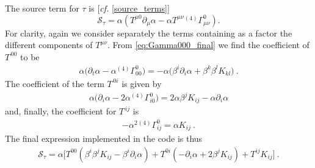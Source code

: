 \documentclass{article}
\begin{document}
The source term for $\tau$ is [{\it cf.} \eqref{source_terms}]
%
\begin{equation}
  \label{eq:SourceT1}
  {\mathcal S}_{\tau} = \alpha \left( T^{\mu 0} \partial_{\mu}
  \alpha - \alpha T^{\mu\nu} {}^{(4)}\Gamma^0_{\mu\nu}\right).
\end{equation}
%
For clarity, again we consider separately the terms containing as a
factor the different components of $T^{\mu\nu}$. From
\eqref{eq:Gamma000_final} we find the coefficient of $T^{\,00}$ to be
%
\begin{eqnarray}
  \label{eq:SourceT3a}
\alpha\big(\partial_t \alpha -\alpha {}^{(4)}\Gamma^0_{00}\big) =
-\alpha\big( \beta^i \partial_i \alpha + \beta^k \beta^l K_{kl}\big)\ .
\end{eqnarray}
%
The coefficient of the term $T^{\,0i}$ is given by
%
\begin{eqnarray}
  \label{eq:SourceT4a}
  \alpha\big(\partial_i \alpha - 2 \alpha {}^{(4)}\Gamma^0_{i0}\big) =
  2 \alpha\beta^j K_{ij} - \alpha\partial_i \alpha
\end{eqnarray}
%
and, finally, the coefficient for $T^{\,ij}$ is
%
\begin{eqnarray}
  \label{eq:SourceT5a}
  -\alpha^2 {}^{(4)}\Gamma^0_{ij} = \alpha K_{ij}\ .
\end{eqnarray}
The final expression implemented in the code is thus
%
\begin{eqnarray}
  \label{eq:SourceT2a}
  {\mathcal S}_{\tau}  = \alpha\big[ T^{00}\left( \beta^i\beta^j K_{ij} - \beta^i
  \partial_i \alpha \right) +  T^{0i} \left( -\partial_i \alpha + 2
  \beta^j K_{ij} \right) 
+ T^{ij} K_{ij}\big]\ .
\end{eqnarray}
\end{document}
